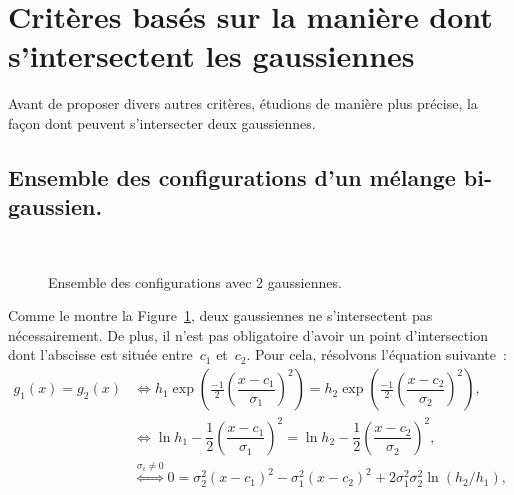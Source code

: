 \documentclass[main.tex]{subfiles}
\begin{document}
\section{Critères basés sur la manière dont s'intersectent les gaussiennes}
Avant de proposer divers autres critères, étudions de manière plus précise, la façon dont peuvent s'intersecter deux gaussiennes.

\subsection{Ensemble des configurations d'un mélange bi-gaussien. \label{sec:config_gmm}}
\begin{figure}[ht]
\centering
{}\qquad
{}\\
\qquad
{}
\caption{\label{fig:config_intersection_gaussienne}Ensemble des configurations avec 2 gaussiennes.}
\end{figure}
Comme le montre la Figure~\ref{fig:config_intersection_gaussienne}, deux gaussiennes ne s'intersectent pas nécessairement. De plus, il n'est pas obligatoire d'avoir un point d'intersection dont l'abscisse est située entre~$c_1$ et~$c_2$. Pour cela, résolvons l'équation suivante~:
\begin{align*}
g_1(x)=g_2(x) 
& \Leftrightarrow h_1\exp \left(\frac{-1}{2} \left( \dfrac{x-c_1}{\sigma_1}\right)^2  \right) = h_2\exp \left(\frac{-1}{2} \left( \dfrac{x-c_2}{\sigma_2}\right)^2  \right), \\
& \Leftrightarrow \ln h_1 - \dfrac{1}{2}\left( \dfrac{x-c_1}{\sigma_1} \right)^2 = \ln h_2 - \dfrac{1}{2}\left( \dfrac{x-c_2}{\sigma_2} \right)^2, \\
& \overset{\sigma_i \neq 0}{\Leftrightarrow} 0 = \sigma_2^2 (x-c_1)^2 - \sigma_1^2 (x-c_2)^2 + 2\sigma_1^2\sigma_2^2 \ln( h_2 / h_1 ),
\end{align*}
\end{document}

